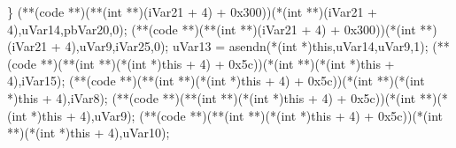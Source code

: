 \documentclass[
]{article}
\newenvironment{Shaded}{}{}
\newcommand{\BaseNTok}[1]{\textcolor[rgb]{0.25,0.63,0.44}{#1}}
\newcommand{\DataTypeTok}[1]{\textcolor[rgb]{0.56,0.13,0.00}{#1}}
\newcommand{\DecValTok}[1]{\textcolor[rgb]{0.25,0.63,0.44}{#1}}
\newcommand{\NormalTok}[1]{#1}
\newcommand{\OperatorTok}[1]{\textcolor[rgb]{0.40,0.40,0.40}{#1}}
\begin{document}
\begin{Shaded}
\begin{Highlighting}[]
  \OperatorTok{\}}
  \OperatorTok{(**(}\NormalTok{code }\OperatorTok{**)(**(}\DataTypeTok{int} \OperatorTok{**)(}\NormalTok{iVar21 }\OperatorTok{+} \DecValTok{4}\OperatorTok{)} \OperatorTok{+} \BaseNTok{0x300}\OperatorTok{))(*(}\DataTypeTok{int} \OperatorTok{**)(}\NormalTok{iVar21 }\OperatorTok{+} \DecValTok{4}\OperatorTok{),}\NormalTok{uVar14}\OperatorTok{,}\NormalTok{pbVar20}\OperatorTok{,}\DecValTok{0}\OperatorTok{);}
  \OperatorTok{(**(}\NormalTok{code }\OperatorTok{**)(**(}\DataTypeTok{int} \OperatorTok{**)(}\NormalTok{iVar21 }\OperatorTok{+} \DecValTok{4}\OperatorTok{)} \OperatorTok{+} \BaseNTok{0x300}\OperatorTok{))(*(}\DataTypeTok{int} \OperatorTok{**)(}\NormalTok{iVar21 }\OperatorTok{+} \DecValTok{4}\OperatorTok{),}\NormalTok{uVar9}\OperatorTok{,}\NormalTok{iVar25}\OperatorTok{,}\DecValTok{0}\OperatorTok{);}
\NormalTok{  uVar13 }\OperatorTok{=}\NormalTok{ asendn}\OperatorTok{(*(}\DataTypeTok{int} \OperatorTok{*)}\NormalTok{this}\OperatorTok{,}\NormalTok{uVar14}\OperatorTok{,}\NormalTok{uVar9}\OperatorTok{,}\DecValTok{1}\OperatorTok{);}
  \OperatorTok{(**(}\NormalTok{code }\OperatorTok{**)(**(}\DataTypeTok{int} \OperatorTok{**)(*(}\DataTypeTok{int} \OperatorTok{*)}\NormalTok{this }\OperatorTok{+} \DecValTok{4}\OperatorTok{)} \OperatorTok{+} \BaseNTok{0x5c}\OperatorTok{))(*(}\DataTypeTok{int} \OperatorTok{**)(*(}\DataTypeTok{int} \OperatorTok{*)}\NormalTok{this }\OperatorTok{+} \DecValTok{4}\OperatorTok{),}\NormalTok{iVar15}\OperatorTok{);}
  \OperatorTok{(**(}\NormalTok{code }\OperatorTok{**)(**(}\DataTypeTok{int} \OperatorTok{**)(*(}\DataTypeTok{int} \OperatorTok{*)}\NormalTok{this }\OperatorTok{+} \DecValTok{4}\OperatorTok{)} \OperatorTok{+} \BaseNTok{0x5c}\OperatorTok{))(*(}\DataTypeTok{int} \OperatorTok{**)(*(}\DataTypeTok{int} \OperatorTok{*)}\NormalTok{this }\OperatorTok{+} \DecValTok{4}\OperatorTok{),}\NormalTok{iVar8}\OperatorTok{);}
  \OperatorTok{(**(}\NormalTok{code }\OperatorTok{**)(**(}\DataTypeTok{int} \OperatorTok{**)(*(}\DataTypeTok{int} \OperatorTok{*)}\NormalTok{this }\OperatorTok{+} \DecValTok{4}\OperatorTok{)} \OperatorTok{+} \BaseNTok{0x5c}\OperatorTok{))(*(}\DataTypeTok{int} \OperatorTok{**)(*(}\DataTypeTok{int} \OperatorTok{*)}\NormalTok{this }\OperatorTok{+} \DecValTok{4}\OperatorTok{),}\NormalTok{uVar9}\OperatorTok{);}
  \OperatorTok{(**(}\NormalTok{code }\OperatorTok{**)(**(}\DataTypeTok{int} \OperatorTok{**)(*(}\DataTypeTok{int} \OperatorTok{*)}\NormalTok{this }\OperatorTok{+} \DecValTok{4}\OperatorTok{)} \OperatorTok{+} \BaseNTok{0x5c}\OperatorTok{))(*(}\DataTypeTok{int} \OperatorTok{**)(*(}\DataTypeTok{int} \OperatorTok{*)}\NormalTok{this }\OperatorTok{+} \DecValTok{4}\OperatorTok{),}\NormalTok{uVar10}\OperatorTok{);}

\end{Highlighting}
\end{Shaded}
\end{document}
